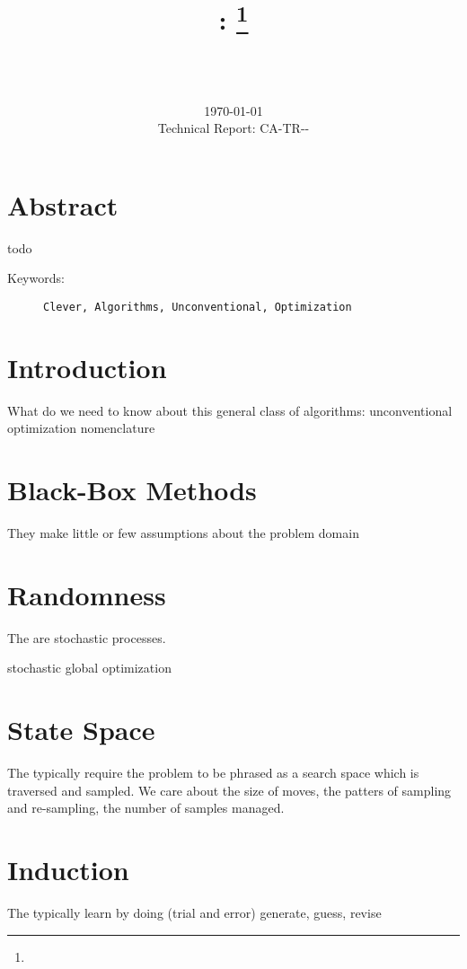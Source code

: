 \documentclass[a4paper, 11pt]{article}
\title{{\myreporttitle}: {\myreportsubtitle}\footnote{\myreportlicense}}
\author{\myreportauthor\\{\myreportemail}\\\small\myreportproject}
\date{\today\\{\small{Technical Report: CA-TR-{\myreportdate}-\myreportversion}}}
\begin{document}
\maketitle

\section*{Abstract} 
todo

\begin{description}
	\item[Keywords:] {\small\texttt{Clever, Algorithms, Unconventional, Optimization}}
\end{description} 

\section{Introduction}
\label{sec:introduction}



What do we need to know about this general class of algorithms: unconventional optimization
nomenclature

% 
% 
\section{Black-Box Methods}
\label{sec:black_box}
They make little or few assumptions about the problem domain


% 
% 
\section{Randomness}
The are stochastic processes.

stochastic global optimization

% 
% 
\section{State Space}
The typically require the problem to be phrased as a search space which is traversed and sampled.
We care about the size of moves, the patters of sampling and re-sampling, the number of samples managed.

% 
% 
\section{Induction}
The typically learn by doing (trial and error)
generate, guess, revise
\end{document}
